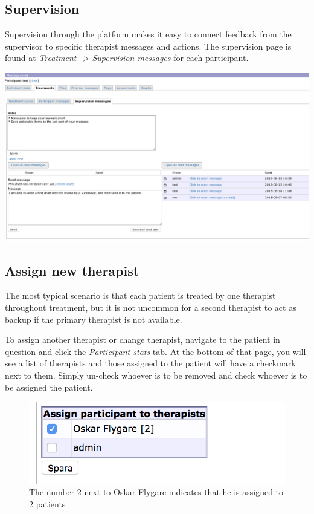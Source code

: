 \documentclass[]{book}
\theoremstyle{definition}
\theoremstyle{definition}
\theoremstyle{definition}
\theoremstyle{remark}
\begin{document}
\hypertarget{supervision}{%
\subsection{Supervision}\label{supervision}}

Supervision through the platform makes it easy to connect feedback from
the supervisor to specific therapist messages and actions. The
supervision page is found at \emph{Treatment -\textgreater{} Supervision
messages} for each participant.

\includegraphics{images/supervision.png}

\hypertarget{assign-new-therapist}{%
\subsection{Assign new therapist}\label{assign-new-therapist}}

The most typical scenario is that each patient is treated by one
therapist throughout treatment, but it is not uncommon for a second
therapist to act as backup if the primary therapist is not available.

To assign another therapist or change therapist, navigate to the patient
in question and click the \emph{Participant stats} tab. At the bottom of
that page, you will see a list of therapists and those assigned to the
patient will have a checkmark next to them. Simply un-check whoever is
to be removed and check whoever is to be assigned the patient.

\begin{figure}
\centering
\includegraphics{images/assign-therapist.png}
\caption{The number 2 next to Oskar Flygare indicates that he is
assigned to 2 patients}
\end{figure}
\end{document}
